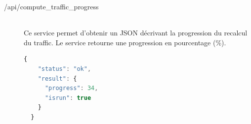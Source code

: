 \begin{description}
  \item[/api/compute\_traffic\_progress] \hfill \\ 
    Ce service permet d'obtenir un JSON décrivant la progression du recalcul du traffic. Le service retourne une progression en pourcentage (\%).\\
    \begin{lstlisting}[language=javascript]
  {
    "status": "ok",
    "result": {
      "progress": 34,
      "isrun": true
    }
  }
    \end{lstlisting}
  
\end{description}



